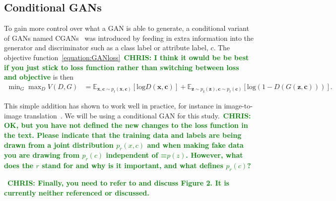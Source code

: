 \documentclass[12pt]{iopart}
\newcommand{\jordan}[1]{\textbf{\textcolor{red}{JORDAN: #1}}}
\newcommand{\chris}[1]{\textbf{\textcolor{green}{CHRIS: #1}}}
\begin{document}
\subsection{Conditional GANs}

%
To gain more control over what a GAN is able to generate, a conditional variant
of \acp{GAN} named \acp{CGAN}~\cite{cgan} was introduced by feeding in extra
information into the generator and discriminator such as a class label or
attribute label, $c$. The objective function~\cref{equation:GANloss}~\chris{I
think it owuld be be best if you just stick to loss function rather than
switching between loss and objective} is then
%
\begin{align}
  \mathop{\text{min}}_{G}  \mathop{\text{max}}_{D} V(D,G) &= \mathbb{E}_{\mathbf{x,c} \sim p_{\text{r}}(\mathbf{x,c})} [\text{log} D(\mathbf{x,c})] + \mathbb{E}_{\mathbf{z} \sim p_{\text{z}}(\mathbf{z}),\mathbf{c} \sim p_{\text{r}}(\mathbf{c})} [\text{log}(1-D(G(\mathbf{z,c})))].
\label{equation:cGANloss}
\end{align}

This simple addition has shown to work well in practice, for instance in
image-to-image translation~\cite{isola2016imagetoimage}. We will be using a
conditional GAN for this study.~\chris{OK, but you have not defined the new
changes to the loss function in the text. Please indicate that the training
data and labels are being drawn from a joint distribution $p_r(x,c)$ and when
making fake data you are drawing from $p_r(c)$ independent of =$p(z)$. However,
what does the $r$ stand for and why is it important, and what defines $p_r(c)$?}

~\chris{Finally, you need to refer to and discuss Figure 2. It is currently
neither referenced or discussed.}

%

%

\end{document}
